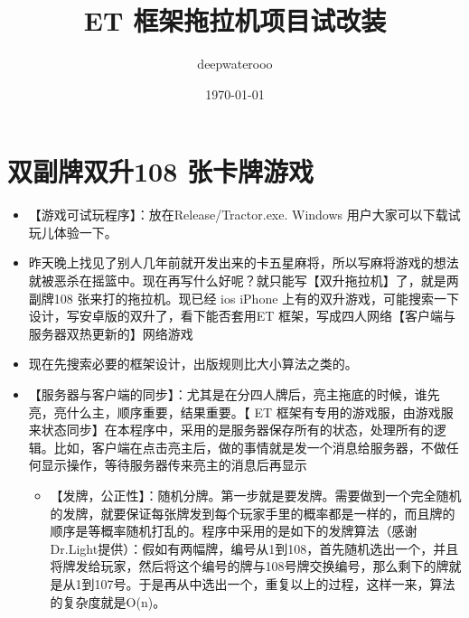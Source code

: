 \documentclass[9pt, b5paper]{article}
\author{deepwaterooo}
\date{\today}
\title{ET 框架拖拉机项目试改装}
\begin{document}
\maketitle
\tableofcontents


\section{双副牌双升108 张卡牌游戏}
\label{sec:org64be5ab}
\begin{itemize}
\item 【游戏可试玩程序】：放在Release/Tractor.exe. Windows 用户大家可以下载试玩儿体验一下。
\item 昨天晚上找见了别人几年前就开发出来的卡五星麻将，所以写麻将游戏的想法就被恶杀在摇篮中。现在再写什么好呢？就只能写【双升拖拉机】了，就是两副牌108 张来打的拖拉机。现已经 ios iPhone 上有的双升游戏，可能搜索一下设计，写安卓版的双升了，看下能否套用ET 框架，写成四人网络【客户端与服务器双热更新的】网络游戏
\item 现在先搜索必要的框架设计，出版规则比大小算法之类的。
\item 【服务器与客户端的同步】：尤其是在分四人牌后，亮主拖底的时候，谁先亮，亮什么主，顺序重要，结果重要。【 ET 框架有专用的游戏服，由游戏服来状态同步】在本程序中，采用的是服务器保存所有的状态，处理所有的逻辑。比如，客户端在点击亮主后，做的事情就是发一个消息给服务器，不做任何显示操作，等待服务器传来亮主的消息后再显示
\begin{itemize}
\item 【发牌，公正性】：随机分牌。第一步就是要发牌。需要做到一个完全随机的发牌，就要保证每张牌发到每个玩家手里的概率都是一样的，而且牌的顺序是等概率随机打乱的。程序中采用的是如下的发牌算法（感谢Dr.Light提供）：假如有两幅牌，编号从1到108，首先随机选出一个，并且将牌发给玩家，然后将这个编号的牌与108号牌交换编号，那么剩下的牌就是从1到107号。于是再从中选出一个，重复以上的过程，这样一来，算法的复杂度就是O(n)。
\end{itemize}
\end{itemize}
\end{document}
